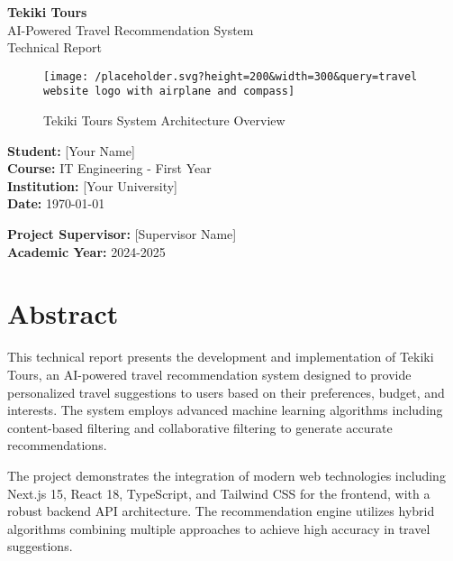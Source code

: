 \documentclass[12pt,a4paper]{article}
\begin{document}
\begin{titlepage}
    \centering
    \vspace*{2cm}
    
    {\Huge\bfseries Tekiki Tours}\\[0.5cm]
    {\LARGE AI-Powered Travel Recommendation System}\\[1.5cm]
    
    {\Large Technical Report}\\[2cm]
    
    \begin{figure}[h]
        \centering
        \texttt{[image: /placeholder.svg?height=200\&width=300\&query=travel website logo with airplane and compass]}
        \caption{Tekiki Tours System Architecture Overview}
    \end{figure}
    
    \vfill
    
    {\large
    \textbf{Student:} [Your Name]\\
    \textbf{Course:} IT Engineering - First Year\\
    \textbf{Institution:} [Your University]\\
    \textbf{Date:} \today\\
    }
    
    \vspace{1cm}
    
    {\large
    \textbf{Project Supervisor:} [Supervisor Name]\\
    \textbf{Academic Year:} 2024-2025
    }
\end{titlepage}

\tableofcontents
\newpage

\section*{Abstract}

This technical report presents the development and implementation of Tekiki Tours, an AI-powered travel recommendation system designed to provide personalized travel suggestions to users based on their preferences, budget, and interests. The system employs advanced machine learning algorithms including content-based filtering and collaborative filtering to generate accurate recommendations.

The project demonstrates the integration of modern web technologies including Next.js 15, React 18, TypeScript, and Tailwind CSS for the frontend, with a robust backend API architecture. The recommendation engine utilizes hybrid algorithms combining multiple approaches to achieve high accuracy in travel suggestions.
\end{document}
